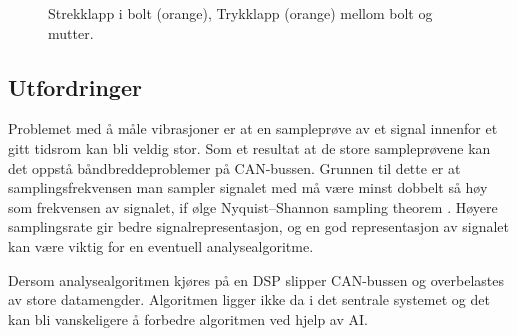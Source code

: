 \begin{figure}[H]
\hfill
{}
\caption{\protect{\ref{fig:Strekklapp_vector}} Strekklapp i bolt (orange), \protect{\ref{fig:Trykklapp_vector}} Trykklapp (orange) mellom bolt og mutter.}
\end{figure}

\subsection{Utfordringer}

Problemet med å måle vibrasjoner er at en sampleprøve av et signal innenfor et gitt tidsrom kan bli veldig stor. Som
et resultat at de store sampleprøvene kan det oppstå båndbreddeproblemer på CAN-bussen. Grunnen til dette
er at samplingsfrekvensen man sampler signalet med må være
minst dobbelt så høy som frekvensen av signalet, if ølge Nyquist–Shannon sampling theorem \cite{nyquist}. Høyere
samplingsrate gir bedre signalrepresentasjon, og en god
representasjon av signalet kan være viktig for en eventuell analysealgoritme. 

Dersom analysealgoritmen kjøres på en DSP slipper CAN-bussen og overbelastes av store datamengder.
Algoritmen ligger ikke da i det sentrale systemet og det kan bli vanskeligere å forbedre algoritmen ved hjelp av AI.